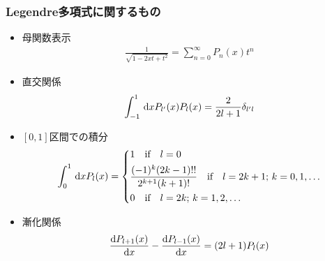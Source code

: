 \subsubsection{Legendre多項式に関するもの}

\begin{itemize}
  \item 母関数表示
    \begin{gather}%
      \frac{1}{\sqrt{1-2xt+t^2}} = \sum_{n=0}^\infty P_n(x) t^n
    \end{gather}%
  \item 直交関係
    \begin{gather}%
      \label{eq:legendre_orthogonal}
      \int_{-1}^1 \dl{x} P_{l'}(x) P_l(x) = \frac{2}{2l+1} \delta_{l'l}
    \end{gather}%
  \item $[0,1]$区間での積分
    \begin{gather}%
      \int_0^1 \dl{x} P_l(x) =
      \begin{dcases}%
        1 \qqtext{if} l = 0\\
        \frac{(-1)^k(2k-1)!!}{2^{k+1} (k+1)!} \qqtext{if} l = 2k+1;\, k = 0,1,\ldots\\
        0 \qqtext{if} l = 2k;\, k = 1, 2, \ldots
      \end{dcases}%
    \end{gather}%
  \item 漸化関係
    \begin{gather}%
      \label{eq:legedre_zenka1}
      \diff{P_{l+1}(x)}{x} - \diff{P_{l-1}(x)}{x} = (2l+1) P_l(x)
    \end{gather}%
\end{itemize}

